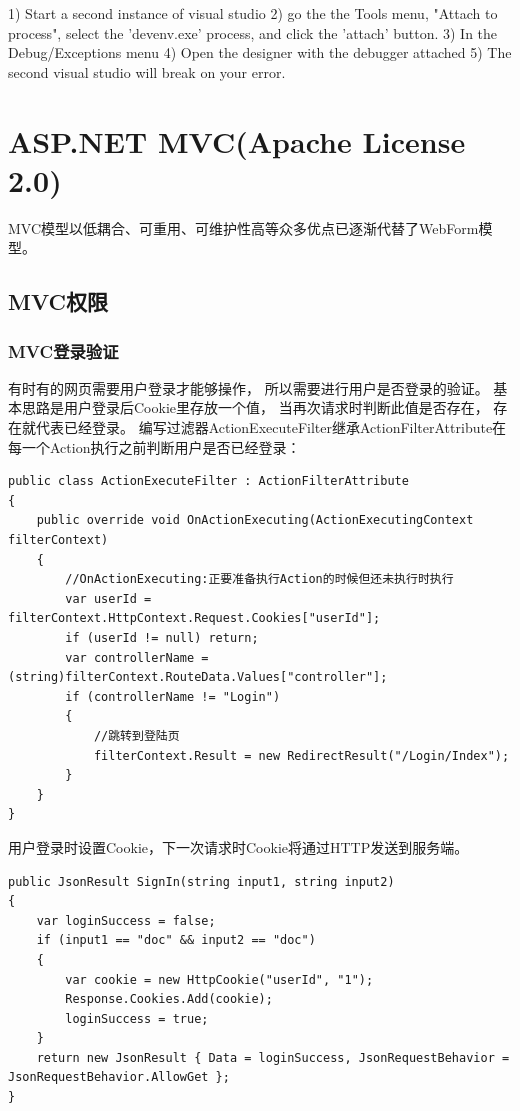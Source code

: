 \documentclass{book}
\begin{document}
1) Start a second instance of visual studio
2) go the the Tools menu, "Attach to process", select the 'devenv.exe' process, and click the 'attach' button.
3) In the Debug/Exceptions menu 
4) Open the designer with the debugger attached
5) The second visual studio will break on your error.

\chapter{ASP.NET MVC(Apache License 2.0)}

MVC模型以低耦合、可重用、可维护性高等众多优点已逐渐代替了WebForm模型。

\clearpage
\mbox{}         
\clearpage

\section{MVC权限}

\subsection{MVC登录验证}

有时有的网页需要用户登录才能够操作，
所以需要进行用户是否登录的验证。
基本思路是用户登录后Cookie里存放一个值，
当再次请求时判断此值是否存在，
存在就代表已经登录。
编写过滤器ActionExecuteFilter继承ActionFilterAttribute在每一个Action执行之前判断用户是否已经登录：

\begin{lstlisting}[language={[Sharp]C}]
public class ActionExecuteFilter : ActionFilterAttribute
{
    public override void OnActionExecuting(ActionExecutingContext filterContext)
    {
        //OnActionExecuting:正要准备执行Action的时候但还未执行时执行
        var userId = filterContext.HttpContext.Request.Cookies["userId"];
        if (userId != null) return;
        var controllerName = (string)filterContext.RouteData.Values["controller"];
        if (controllerName != "Login")
        {
            //跳转到登陆页
            filterContext.Result = new RedirectResult("/Login/Index");
        }
    }
}
\end{lstlisting}

用户登录时设置Cookie，下一次请求时Cookie将通过HTTP发送到服务端。

\begin{lstlisting}[language={[Sharp]C}]
public JsonResult SignIn(string input1, string input2)
{
    var loginSuccess = false;
    if (input1 == "doc" && input2 == "doc")
    {
        var cookie = new HttpCookie("userId", "1");
        Response.Cookies.Add(cookie);
        loginSuccess = true;
    }
    return new JsonResult { Data = loginSuccess, JsonRequestBehavior = JsonRequestBehavior.AllowGet };
}
\end{lstlisting}
\end{document}
